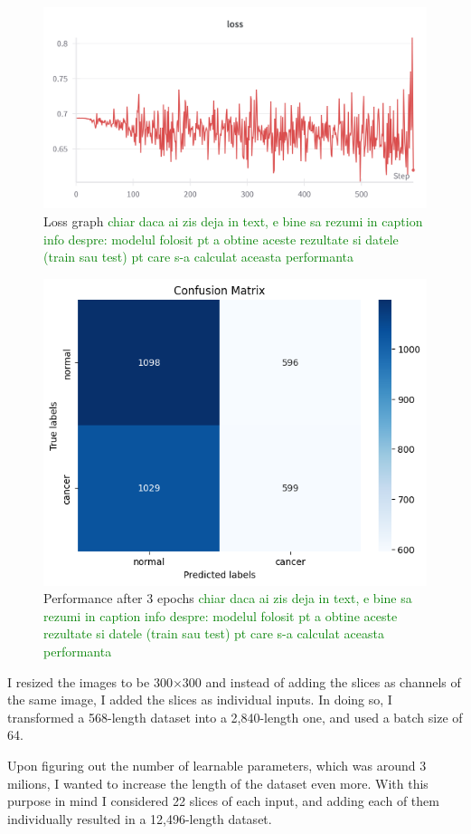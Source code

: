\begin{figure}[!ht]
    \centering
    \includegraphics[width=1\linewidth]{figures/Figure17.png}
    \caption{Loss graph
    \textcolor{green}{chiar daca ai zis deja in text, e bine sa rezumi in caption info despre: modelul folosit pt a obtine aceste rezultate si datele (train sau test) pt care s-a calculat aceasta performanta}
    }
    \label{fig:fig16}
\end{figure}

\begin{figure}[!ht]
    \centering
    \includegraphics[width=0.5\linewidth]{figures/Figure18.png}
    \caption{Performance after 3 epochs
    \textcolor{green}{chiar daca ai zis deja in text, e bine sa rezumi in caption info despre: modelul folosit pt a obtine aceste rezultate si datele (train sau test) pt care s-a calculat aceasta performanta}
    }
    \label{fig:fig17}
\end{figure}

I resized the images to be 300$\times$300 and instead of adding the slices as channels of the same image, I added the slices as individual inputs. In doing so, I transformed a 568-length dataset into a 2,840-length one, and used a batch size of 64.


Upon figuring out the number of learnable parameters, which was around 3 milions, I wanted to increase the length of the dataset even more. With this purpose in mind I considered 22 slices of each input, and adding each of them individually resulted in a 12,496-length dataset.

